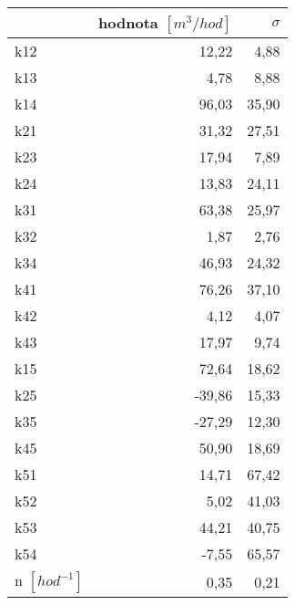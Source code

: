 \begin{tabular}{lrr}
\toprule
{} &  hodnota $\left[\si{m^3/hod}\right]$ &  $\sigma$ \\
\midrule
k12                 &                                12,22 &      4,88 \\
k13                 &                                 4,78 &      8,88 \\
k14                 &                                96,03 &     35,90 \\
k21                 &                                31,32 &     27,51 \\
k23                 &                                17,94 &      7,89 \\
k24                 &                                13,83 &     24,11 \\
k31                 &                                63,38 &     25,97 \\
k32                 &                                 1,87 &      2,76 \\
k34                 &                                46,93 &     24,32 \\
k41                 &                                76,26 &     37,10 \\
k42                 &                                 4,12 &      4,07 \\
k43                 &                                17,97 &      9,74 \\
k15                 &                                72,64 &     18,62 \\
k25                 &                               -39,86 &     15,33 \\
k35                 &                               -27,29 &     12,30 \\
k45                 &                                50,90 &     18,69 \\
k51                 &                                14,71 &     67,42 \\
k52                 &                                 5,02 &     41,03 \\
k53                 &                                44,21 &     40,75 \\
k54                 &                                -7,55 &     65,57 \\
n $[\si{hod^{-1}}]$ &                                 0,35 &      0,21 \\
\bottomrule
\end{tabular}
